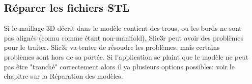 
\subsection{R\'eparer les fichiers STL} %
\label{sub:cleaning_stls}
Si le maillage 3D d\'ecrit dans le mod\`ele contient des trous, ou les bords ne sont pas align\'es (connu comme \'etant non-manifold), Slic3r peut avoir des probl\`emes pour le traiter. Slic3r va tenter de r\'esoudre les probl\`emes, mais certains probl\`emes sont hors de sa port\'ee. Si l'application se plaint que le mod\`ele ne peut pas \^etre "tranch\'e" correctement alors il ya plusieurs options possibles: voir le chapitre sur la R\'eparation des mod\`eles.

